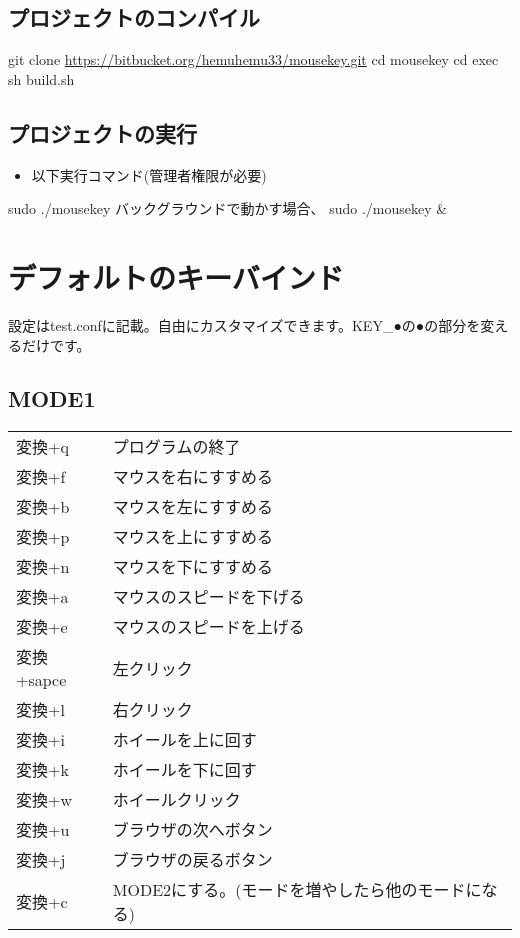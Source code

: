 \documentclass[11pt]{article}
\begin{document}
\subsection{プロジェクトのコンパイル}
\label{sec:org8d23935}
git clone \url{https://bitbucket.org/hemuhemu33/mousekey.git}
cd mousekey
cd exec
sh build.sh

\subsection{プロジェクトの実行}
\label{sec:orgbdf4309}
\begin{itemize}
\item 以下実行コマンド(管理者権限が必要)
\end{itemize}
sudo ./mousekey
バックグラウンドで動かす場合、
sudo ./mousekey \&

\section{デフォルトのキーバインド}
\label{sec:org8dc8d9c}
設定はtest.confに記載。自由にカスタマイズできます。KEY\_●の●の部分を変えるだけです。
\subsection{MODE1}
\label{sec:org02adf99}
\begin{center}
\begin{tabular}{ll}
変換+q & プログラムの終了\\
変換+f & マウスを右にすすめる\\
変換+b & マウスを左にすすめる\\
変換+p & マウスを上にすすめる\\
変換+n & マウスを下にすすめる\\
変換+a & マウスのスピードを下げる\\
変換+e & マウスのスピードを上げる\\
変換+sapce & 左クリック\\
変換+l & 右クリック\\
変換+i & ホイールを上に回す\\
変換+k & ホイールを下に回す\\
変換+w & ホイールクリック\\
変換+u & ブラウザの次へボタン\\
変換+j & ブラウザの戻るボタン\\
変換+c & MODE2にする。(モードを増やしたら他のモードになる)\\
\end{tabular}
\end{center}
\end{document}
